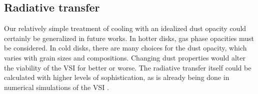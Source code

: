%
%

\subsection{Radiative transfer} 
Our relatively simple treatment of cooling with an idealized dust opacity
could certainly be generalized in future works.  In hotter disks, gas phase opacities
must be considered.   In cold disks, there are many choices for the dust opacity, which 
varies with grain sizes and compositions. Changing dust properties would alter 
the viability of the VSI for better or worse.  The radiative transfer itself
could be calculated with higher levels of sophistication, as is already being done in
numerical simulations of the VSI \citep{stoll14}.


